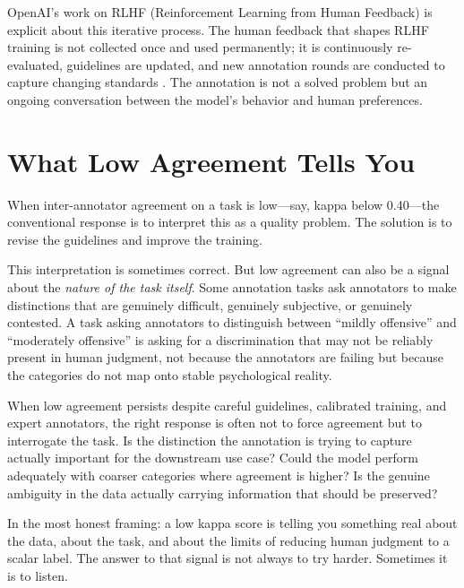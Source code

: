 OpenAI's work on RLHF (Reinforcement Learning from Human Feedback) is explicit about this iterative process. The human feedback that shapes RLHF training is not collected once and used permanently; it is continuously re-evaluated, guidelines are updated, and new annotation rounds are conducted to capture changing standards \autocite{ouyang2022training}. The annotation is not a solved problem but an ongoing conversation between the model's behavior and human preferences.

\section{What Low Agreement Tells You}
\label{sec:ch7-low-kappa}

When inter-annotator agreement on a task is low---say, kappa below 0.40---the conventional response is to interpret this as a quality problem. The solution is to revise the guidelines and improve the training.

This interpretation is sometimes correct. But low agreement can also be a signal about the \emph{nature of the task itself}. Some annotation tasks ask annotators to make distinctions that are genuinely difficult, genuinely subjective, or genuinely contested. A task asking annotators to distinguish between ``mildly offensive'' and ``moderately offensive'' is asking for a discrimination that may not be reliably present in human judgment, not because the annotators are failing but because the categories do not map onto stable psychological reality.

When low agreement persists despite careful guidelines, calibrated training, and expert annotators, the right response is often not to force agreement but to interrogate the task. Is the distinction the annotation is trying to capture actually important for the downstream use case? Could the model perform adequately with coarser categories where agreement is higher? Is the genuine ambiguity in the data actually carrying information that should be preserved?

\begin{keyconcept}
In the most honest framing: a low kappa score is telling you something real about the data, about the task, and about the limits of reducing human judgment to a scalar label. The answer to that signal is not always to try harder. Sometimes it is to listen.
\end{keyconcept}

